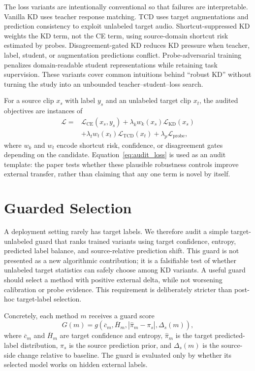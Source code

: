 \documentclass{article}
\begin{document}
The loss variants are intentionally conventional so that failures are interpretable. Vanilla KD uses teacher response matching. TCD uses target augmentations and prediction consistency to exploit unlabeled target audio. Shortcut-suppressed KD weights the KD term, not the CE term, using source-domain shortcut risk estimated by probes. Disagreement-gated KD reduces KD pressure when teacher, label, student, or augmentation predictions conflict. Probe-adversarial training penalizes domain-readable student representations while retaining task supervision. These variants cover common intuitions behind ``robust KD'' without turning the study into an unbounded teacher--student--loss search.

For a source clip $x_s$ with label $y_s$ and an unlabeled target clip $x_t$, the audited objectives are instances of
\begin{equation}
\begin{aligned}
\mathcal{L} ={}&
\mathcal{L}_{\mathrm{CE}}(x_s,y_s)
+ \lambda_k w_k(x_s)\mathcal{L}_{\mathrm{KD}}(x_s) \\
&+ \lambda_t w_t(x_t)\mathcal{L}_{\mathrm{TCD}}(x_t)
+ \lambda_p\mathcal{L}_{\mathrm{probe}},
\end{aligned}
\label{eq:audit_loss}
\end{equation}
where $w_k$ and $w_t$ encode shortcut risk, confidence, or disagreement gates depending on the candidate. Equation~\ref{eq:audit_loss} is used as an audit template: the paper tests whether these plausible robustness controls improve external transfer, rather than claiming that any one term is novel by itself.

\section{Guarded Selection}
A deployment setting rarely has target labels. We therefore audit a simple target-unlabeled guard that ranks trained variants using target confidence, entropy, predicted label balance, and source-relative prediction shift. This guard is not presented as a new algorithmic contribution; it is a falsifiable test of whether unlabeled target statistics can safely choose among KD variants. A useful guard should select a method with positive external delta, while not worsening calibration or probe evidence. This requirement is deliberately stricter than post-hoc target-label selection.

Concretely, each method $m$ receives a guard score
\begin{equation}
G(m)=
g\left(\overline{c}_m, \overline{H}_m,
\left|\hat{\pi}_m-\pi_s\right|, \Delta_s(m)\right),
\label{eq:guard}
\end{equation}
where $\overline{c}_m$ and $\overline{H}_m$ are target confidence and entropy, $\hat{\pi}_m$ is the target predicted-label distribution, $\pi_s$ is the source prediction prior, and $\Delta_s(m)$ is the source-side change relative to baseline. The guard is evaluated only by whether its selected model works on hidden external labels.
\end{document}
